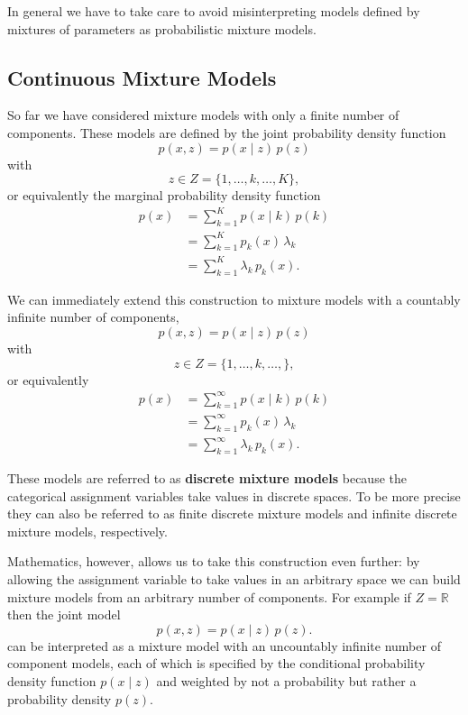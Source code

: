 \documentclass[
  letterpaper,
  DIV=11,
  numbers=noendperiod]{scrartcl}
\begin{document}
In general we have to take care to avoid misinterpreting models defined
by mixtures of parameters as probabilistic mixture models.

\subsection{Continuous Mixture Models}\label{continuous-mixture-models}

So far we have considered mixture models with only a finite number of
components. These models are defined by the joint probability density
function \[
p(x, z) = p(x \mid z) \, p(z)
\] with \[
z \in Z = \{ 1, \ldots, k, \ldots, K \},
\] or equivalently the marginal probability density function
\begin{align*}
p(x)
&=
\sum_{k = 1}^{K} p(x \mid k) \, p(k)
\\
&=
\sum_{k = 1}^{K} p_{k}(x) \, \lambda_{k}
\\
&=
\sum_{k = 1}^{K} \lambda_{k} \, p_{k}(x).
\end{align*}

We can immediately extend this construction to mixture models with a
countably infinite number of components, \[
p(x, z) = p(x \mid z) \, p(z)
\] with \[
z \in Z = \{ 1, \ldots, k, \ldots, \},
\] or equivalently \begin{align*}
p(x)
&=
\sum_{k = 1}^{\infty} p(x \mid k) \, p(k)
\\
&=
\sum_{k = 1}^{\infty} p_{k}(x) \, \lambda_{k}
\\
&=
\sum_{k = 1}^{\infty} \lambda_{k} \, p_{k}(x).
\end{align*}

These models are referred to as \textbf{discrete mixture models} because
the categorical assignment variables take values in discrete spaces. To
be more precise they can also be referred to as finite discrete mixture
models and infinite discrete mixture models, respectively.

Mathematics, however, allows us to take this construction even further:
by allowing the assignment variable to take values in an arbitrary space
we can build mixture models from an arbitrary number of components. For
example if \(Z = \mathbb{R}\) then the joint model \[
p(x, z) = p(x \mid z) \, p(z).
\] can be interpreted as a mixture model with an uncountably infinite
number of component models, each of which is specified by the
conditional probability density function \(p(x \mid z)\) and weighted by
not a probability but rather a probability density \(p(z)\).
\end{document}
